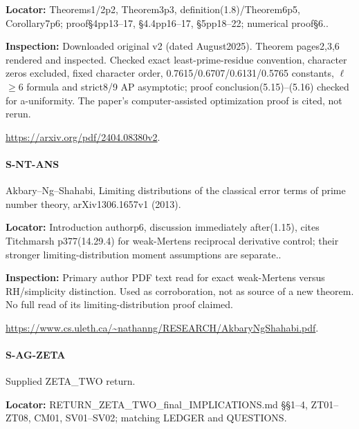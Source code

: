 \documentclass[11pt,a4paper]{article}
\begin{document}
\textbf{Locator:} Theorems1/\allowbreak{}2p2, Theorem3p3, definition(1.\allowbreak{}8)/\allowbreak{}Theorem6p5, Corollary7p6; proof§4pp13–\allowbreak{}17, §4.\allowbreak{}4pp16–\allowbreak{}17, §5pp18–\allowbreak{}22; numerical proof§6.\allowbreak{}.

\textbf{Inspection:} Downloaded original v2 (dated August2025).\allowbreak{} Theorem pages2,3,6 rendered and inspected.\allowbreak{} Checked exact least-prime-residue convention, character zeros excluded, fixed character order, 0.\allowbreak{}7615/\allowbreak{}0.\allowbreak{}6707/\allowbreak{}0.\allowbreak{}6131/\allowbreak{}0.\allowbreak{}5765 constants, \ensuremath{\ell}\ensuremath{\ge}6 formula and strict8/\allowbreak{}9 AP asymptotic; proof conclusion(5.\allowbreak{}15)–\allowbreak{}(5.\allowbreak{}16) checked for a-uniformity.\allowbreak{} The paper’s computer-assisted optimization proof is cited, not rerun.\allowbreak{}

\url{https://arxiv.org/pdf/2404.08380v2}.

\paragraph{S-NT-ANS} Akbary–\allowbreak{}Ng–\allowbreak{}Shahabi, Limiting distributions of the classical error terms of prime number theory, arXiv1306.\allowbreak{}1657v1 (2013).

\textbf{Locator:} Introduction authorp6, discussion immediately after(1.\allowbreak{}15), cites Titchmarsh p377(14.\allowbreak{}29.\allowbreak{}4) for weak-Mertens reciprocal derivative control; their stronger limiting-distribution moment assumptions are separate.\allowbreak{}.

\textbf{Inspection:} Primary author PDF text read for exact weak-Mertens versus RH/\allowbreak{}simplicity distinction.\allowbreak{} Used as corroboration, not as source of a new theorem.\allowbreak{} No full read of its limiting-distribution proof claimed.\allowbreak{}

\url{https://www.cs.uleth.ca/~nathanng/RESEARCH/AkbaryNgShahabi.pdf}.

\paragraph{S-AG-ZETA} Supplied ZETA\_\allowbreak{}TWO return.

\textbf{Locator:} RETURN\_\allowbreak{}ZETA\_\allowbreak{}TWO\_\allowbreak{}final\_\allowbreak{}IMPLICATIONS.\allowbreak{}md §§1–\allowbreak{}4, ZT01–\allowbreak{}ZT08, CM01, SV01–\allowbreak{}SV02; matching LEDGER and QUESTIONS.
\end{document}
